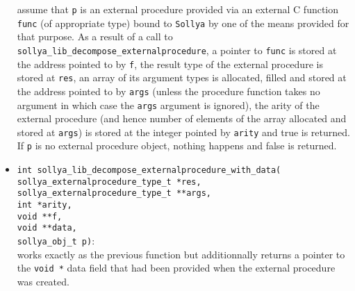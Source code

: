 \documentclass[a4paper]{article}
\newcommand{\sollya}{\texttt{Sollya}\xspace}
\begin{document}
\begin{itemize}
assume that \verb|p| is an external procedure provided via an external C function \verb|func| (of appropriate type) bound to \sollya by one of the means provided for that purpose. As a result of a call to \verb|sollya_lib_decompose_externalprocedure|, a pointer to \verb|func| is stored at the address pointed to by \verb|f|, the result type of the external procedure is stored at \verb|res|,
an array of its argument types is allocated, filled and stored at the address pointed to by \verb|args| (unless the procedure function takes no argument in which case the \verb|args| argument is ignored), the arity of the external procedure (and hence number of elements of the array allocated and stored at \verb|args|) is stored at the integer pointed by \verb|arity| and true is returned. If \verb|p| is no external procedure object, nothing happens and false is returned.
\item \verb|int sollya_lib_decompose_externalprocedure_with_data(|\\
\verb|sollya_externalprocedure_type_t *res,|\\
\verb|sollya_externalprocedure_type_t **args,|\\
\verb|int *arity,|\\
\verb|void **f,|\\
\verb|void **data,|\\
\verb|sollya_obj_t p)|:\\
works exactly as the previous function but additionnally returns a pointer to the \verb|void *| data field that had been provided when the external procedure was created.
\end{itemize}
\end{document}
